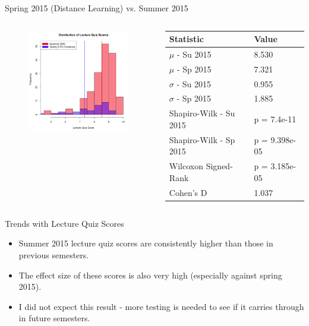 \documentclass{beamer}
\begin{document}
\begin{frame}{Spring 2015 (Distance Learning) vs. Summer 2015}
\begin{columns}
\begin{column}{2in}
\begin{figure}
	\includegraphics[width=2in]{img/chapter4/lq_su15_vs_sp15d}
\end{figure}
\end{column}
\begin{column}{2in}
\begin{scriptsize}
\begin{table}
  \begin{tabular}{|l|l|}
    \hline
    \textbf{Statistic} & \textbf{Value} \\
	\hline
	$\mu$ - Su 2015 & 8.530 \\
	\hline
	$\mu$ - Sp 2015 & 7.321 \\
	\hline
	$\sigma$ - Su 2015 & 0.955 \\
	\hline
	$\sigma$ - Sp 2015 & 1.885 \\
	\hline
	Shapiro-Wilk - Su 2015 & p = 7.4e-11 \\
	\hline
	Shapiro-Wilk - Sp 2015 & p = 9.398e-05 \\
	\hline
	Wilcoxon Signed-Rank & p = 3.185e-05 \\
	\hline
	Cohen's D & 1.037 \\
	\hline
  \end{tabular}
\end{table}
\end{scriptsize}
\end{column}
\end{columns}
\end{frame}

\begin{frame}{Trends with Lecture Quiz Scores}
  \begin{itemize}
    \item Summer 2015 lecture quiz scores are consistently higher than those in previous semesters.
    \item The effect size of these scores is also very high (especially against spring 2015).
    \item I did not expect this result - more testing is needed to see if it carries through in future semesters.
  \end{itemize}
\end{frame}
\end{document}
